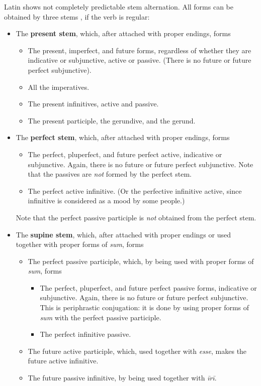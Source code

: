 \documentclass[a4paper, oneside]{report}
\newcommand*{\citesec}[1]{\S~{#1}}
\newcommand*{\concept}[1]{\textbf{#1}}
\newcommand{\form}[1]{\emph{#1}}
\begin{document}
Latin shows not completely predictable stem alternation.
All forms can be obtained by three stems \citep[\citesec{164}]{allen1903allen},
if the verb is regular:
\begin{itemize}
    \item The \concept{present stem}, which, after attached with proper endings, forms
    \begin{itemize}
        \item The \acl{present}, \acl{imperfect}, and future forms, 
        regardless of whether they are indicative or subjunctive,
        active or passive. (There is no future or future perfect subjunctive).
        \item All the imperatives.
        \item The present infinitives, active and passive.
        \item The present participle, the gerundive, and the gerund.
    \end{itemize}
    \item The \concept{perfect stem}, which, after attached with proper endings, forms 
    \begin{itemize}
        \item The perfect, pluperfect, and future perfect active, indicative or subjunctive.
        Again, there is no future or future perfect subjunctive.
        Note that the passives are \emph{not} formed by the perfect stem.
        \item The perfect active infinitive. 
        (Or the perfective infinitive active, since infinitive is considered as a mood by some people.)
    \end{itemize}
    Note that the perfect passive participle is \emph{not} obtained from the perfect stem.
    \item The \concept{supine stem}, 
    which, after attached with proper endings or used together with proper forms of \form{sum},
    forms 
    \begin{itemize}
        \item The perfect passive participle, which, by being used with proper forms of \form{sum}, forms
        \begin{itemize}
            \item The perfect, pluperfect, and future perfect passive forms, indicative or subjunctive.
            Again, there is no future or future perfect subjunctive.
            This is periphrastic conjugation: it is done by using proper forms of \form{sum}
            with the perfect passive participle.
            \item The perfect infinitive passive.
        \end{itemize}
        \item The future active participle, which, used together with \form{esse},
        makes the future active infinitive.
        \item The future passive infinitive, by being used together with \form{īrī}.
    \end{itemize}
\end{itemize}
\end{document}
